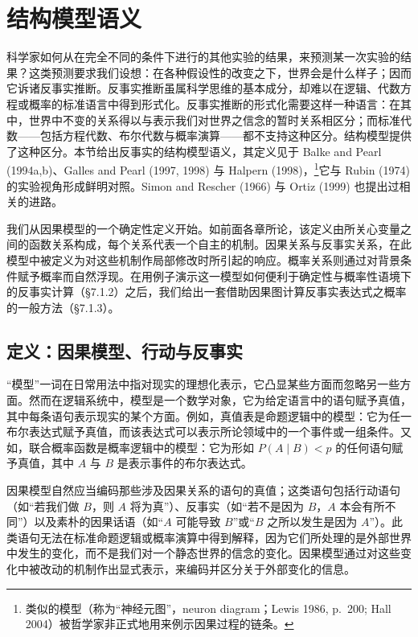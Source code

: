\section{结构模型语义}

科学家如何从在完全不同的条件下进行的其他实验的结果，来预测某一次实验的结果？这类预测要求我们设想：在各种假设性的改变之下，世界会是什么样子；因而它诉诸反事实推断。反事实推断虽属科学思维的基本成分，却难以在逻辑、代数方程或概率的标准语言中得到形式化。反事实推断的形式化需要这样一种语言：在其中，世界中不变的关系得以与表示我们对世界之信念的暂时关系相区分；而标准代数——包括方程代数、布尔代数与概率演算——都不支持这种区分。结构模型提供了这种区分。本节给出反事实的结构模型语义，其定义见于 Balke and Pearl (1994a,b)、Galles and Pearl (1997, 1998) 与 Halpern (1998)，\footnote{类似的模型（称为“神经元图”，neuron diagram；Lewis 1986, p.~200; Hall 2004）被哲学家非正式地用来例示因果过程的链条。}它与 Rubin (1974) 的实验视角形成鲜明对照。Simon and Rescher (1966) 与 Ortiz (1999) 也提出过相关的进路。

我们从因果模型的一个确定性定义开始。如前面各章所论，该定义由所关心变量之间的函数关系构成，每个关系代表一个自主的机制。因果关系与反事实关系，在此模型中被定义为对这些机制作局部修改时所引起的响应。概率关系则通过对背景条件赋予概率而自然浮现。在用例子演示这一模型如何便利于确定性与概率性语境下的反事实计算（\S 7.1.2）之后，我们给出一套借助因果图计算反事实表达式之概率的一般方法（\S 7.1.3）。

\subsection{定义：因果模型、行动与反事实}

“模型”一词在日常用法中指对现实的理想化表示，它凸显某些方面而忽略另一些方面。然而在逻辑系统中，模型是一个数学对象，它为给定语言中的语句赋予真值，其中每条语句表示现实的某个方面。例如，真值表是命题逻辑中的模型：它为任一布尔表达式赋予真值，而该表达式可以表示所论领域中的一个事件或一组条件。又如，联合概率函数是概率逻辑中的模型：它为形如 $P(A\mid B)<p$ 的任何语句赋予真值，其中 $A$ 与 $B$ 是表示事件的布尔表达式。

因果模型自然应当编码那些涉及因果关系的语句的真值；这类语句包括行动语句（如“若我们做 $B$，则 $A$ 将为真”）、反事实（如“若不是因为 $B$，$A$ 本会有所不同”）以及素朴的因果话语（如“$A$ 可能导致 $B$”或“$B$ 之所以发生是因为 $A$”）。此类语句无法在标准命题逻辑或概率演算中得到解释，因为它们所处理的是外部世界中发生的变化，而不是我们对一个静态世界的信念的变化。因果模型通过对这些变化中被改动的机制作出显式表示，来编码并区分关于外部变化的信息。

